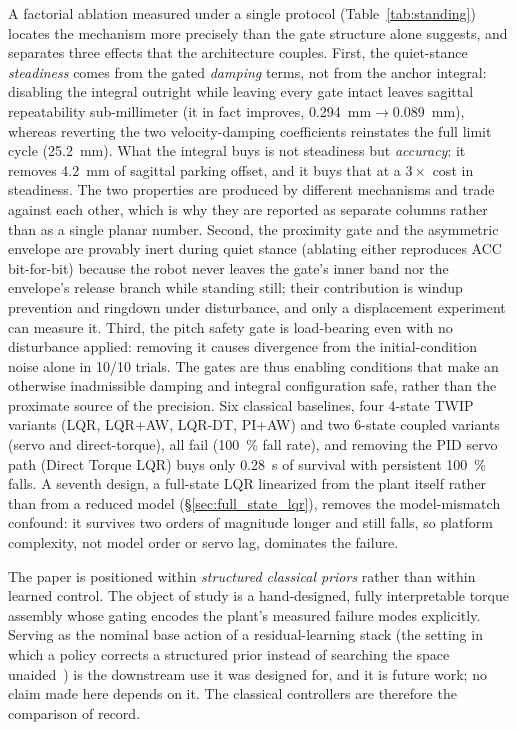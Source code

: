 \documentclass[conference]{IEEEtran}
\begin{document}
A factorial ablation measured under a single protocol (Table~\ref{tab:standing}) locates the mechanism more precisely than the gate structure alone suggests, and separates three effects that the architecture couples. First, the quiet-stance \emph{steadiness} comes from the gated \emph{damping} terms, not from the anchor integral: disabling the integral outright while leaving every gate intact leaves sagittal repeatability sub-millimeter (it in fact improves, \SI{0.294}{mm}$\rightarrow$\SI{0.089}{mm}), whereas reverting the two velocity-damping coefficients reinstates the full limit cycle (\SI{25.2}{mm}). What the integral buys is not steadiness but \emph{accuracy}: it removes \SI{4.2}{mm} of sagittal parking offset, and it buys that at a $3{\times}$ cost in steadiness. The two properties are produced by different mechanisms and trade against each other, which is why they are reported as separate columns rather than as a single planar number. Second, the proximity gate and the asymmetric envelope are provably inert during quiet stance (ablating either reproduces ACC bit-for-bit) because the robot never leaves the gate's inner band nor the envelope's release branch while standing still; their contribution is windup prevention and ringdown under disturbance, and only a displacement experiment can measure it. Third, the pitch safety gate is load-bearing even with no disturbance applied: removing it causes divergence from the initial-condition noise alone in \num{10}/\num{10} trials. The gates are thus enabling conditions that make an otherwise inadmissible damping and integral configuration safe, rather than the proximate source of the precision.
Six classical baselines, four 4-state TWIP variants (LQR, LQR+AW, LQR-DT, PI+AW) and two 6-state coupled variants (servo and direct-torque), all fail (\SI{100}{\percent} fall rate), and removing the PID servo path (Direct Torque LQR) buys only \SI{0.28}{s} of survival with persistent \SI{100}{\percent} falls. A seventh design, a full-state LQR linearized from the plant itself rather than from a reduced model (\S\ref{sec:full_state_lqr}), removes the model-mismatch confound: it survives two orders of magnitude longer and still falls, so platform complexity, not model order or servo lag, dominates the failure.

The paper is positioned within \emph{structured classical priors} rather than within learned control. The object of study is a hand-designed, fully interpretable torque assembly whose gating encodes the plant's measured failure modes explicitly. Serving as the nominal base action of a residual-learning stack (the setting in which a policy corrects a structured prior instead of searching the space unaided~\cite{johannink2019residual,silver2018residual}) is the downstream use it was designed for, and it is future work; no claim made here depends on it. The classical controllers are therefore the comparison of record.
\end{document}
